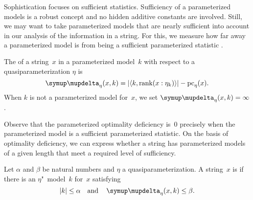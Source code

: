 Sophistication focuses on sufficient statistics.
Sufficiency of a parameterized models is a robust concept and no hidden additive constants are involved.
Still, we may want to take parameterized models that are nearly sufficient into account in our analysis of the information in a string.
For this, we measure how far away a parameterized model is from being a sufficient parameterized statistic \parencite{vereshchagin2017algorithmic}.
\begin{definition}
  The  of a string~$x$ in a parameterized model~$k$ with respect to a quasiparameterization $\eta$ is
  \begin{equation*}
    \updelta_\eta(x, k) \deq \length{\pair{k}{\rank(x : \eta_k)}} - \pc_\eta(x).
  \end{equation*}
  When $k$ is not a parameterized model for~$x$, we set $\updelta_\eta(x, k) \deq \infty$.
\end{definition}
Observe that the parameterized optimality deficiency is~$0$ precisely when the parameterized model is a sufficient parameterized statistic.
On the basis of optimality deficiency, we can express whether a string has parameterized models of a given length that meet a required level of sufficiency.
\begin{definition}
  Let $\alpha$ and $\beta$ be natural numbers and $\eta$ a quasiparameterization.
  A string~$x$ is  if there is an $\eta$"~model~$k$ for~$x$ satisfying
  \begin{equation*}
    \length{k} \le \alpha \quad\text{and}\quad \updelta_\eta(x, k) \le \beta.
  \end{equation*}
\end{definition}
